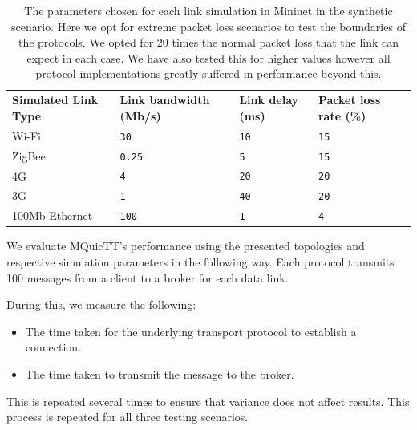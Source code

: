 \begin{table}[ht]
    \caption{The parameters chosen for each link simulation in Mininet in the synthetic scenario. Here we opt for extreme packet loss scenarios to test the boundaries of the protocols. We opted for 20 times the normal packet loss that the link can expect in each case. We have also tested this for higher values however all protocol implementations greatly suffered in performance beyond this.}\label{tab:links:synth}
    \begin{tabular}{@{}llll@{}}
        \toprule
        \textbf{Simulated Link Type} & \textbf{Link bandwidth (Mb/s)} & \textbf{Link delay (ms)} & \textbf{Packet loss rate (\%)} \\
        Wi-Fi                        & \texttt{30}                    & \texttt{10}              & \texttt{15}                     \\
        ZigBee                       & \texttt{0.25}                  & \texttt{5}               & \texttt{15}                     \\
        4G                           & \texttt{4}                     & \texttt{20}              & \texttt{20}                   \\
        3G                           & \texttt{1}                     & \texttt{40}              & \texttt{20}                   \\
        100Mb Ethernet               & \texttt{100}                   & \texttt{1}               & \texttt{4}                   \\
        \bottomrule
    \end{tabular}
\end{table}

We evaluate MQuicTT's performance using the presented topologies and respective simulation parameters in the following way.
Each protocol transmits 100 messages from a client to a broker for each data link.

During this, we measure the following:

\begin{itemize}
    \item The time taken for the underlying transport protocol to establish a connection.
    \item The time taken to transmit the message to the broker.
\end{itemize}

This is repeated several times to ensure that variance does not affect results.
This process is repeated for all three testing scenarios.

